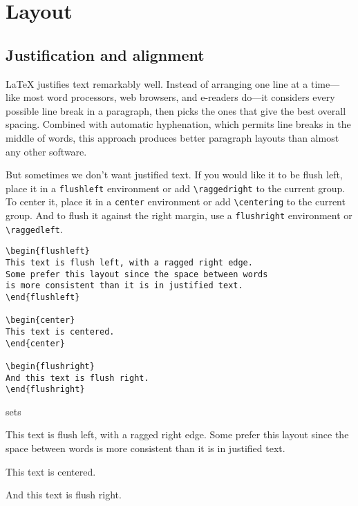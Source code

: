 \chapter{Layout}

\section{Justification and alignment}

\LaTeX{} justifies text remarkably well.
Instead of arranging one line at a time---like most word processors,
web browsers, and e-readers do---it considers every possible line break
in a paragraph, then picks the ones that give the best overall
spacing.\punckern{}
Combined with automatic hyphenation,
which permits line breaks in the middle of words,\punckern{}
this approach produces better paragraph layouts than almost any other software.

But sometimes we don't want justified text.
If you would like it to be flush left,
place it in a \texttt{flushleft} environment
or add \verb|\raggedright| to the current group.
To center it, place it in a
\texttt{center} environment or add \verb|\centering| to the current group.
And to flush it against the right margin,
use a \texttt{flushright} environment or \verb|\raggedleft|.

\begin{leftfigure}
\begin{lstlisting}
\begin{flushleft}
This text is flush left, with a ragged right edge.
Some prefer this layout since the space between words
is more consistent than it is in justified text.
\end{flushleft}

\begin{center}
This text is centered.
\end{center}

\begin{flushright}
And this text is flush right.
\end{flushright}
\end{lstlisting}
\end{leftfigure}
sets
\begin{flushleftfigure}
\begin{minipage}{0.99\textwidth}
\lm%
\begin{flushleft}
This text is flush left, with a ragged right edge.
Some prefer this layout since the space between words
is more consistent than it is in justified text.
\end{flushleft}

\begin{center}
This text is centered.
\end{center}

\begin{flushright}
And this text is flush right.
\end{flushright}
\end{minipage}
\end{flushleftfigure}

